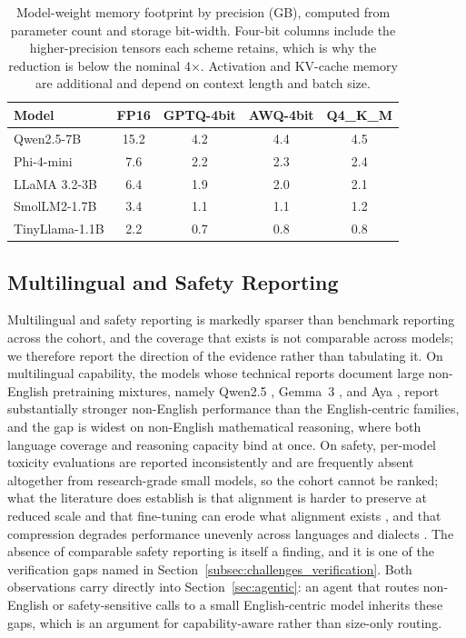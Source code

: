 \begin{table}[ht]
\centering
\caption{Model-weight memory footprint by precision (GB), computed from parameter count and storage bit-width. Four-bit columns include the higher-precision tensors each scheme retains, which is why the reduction is below the nominal 4$\times$. Activation and KV-cache memory are additional and depend on context length and batch size.}
\label{tab:memory_footprint}
\footnotesize
\begin{tabular}{lcccc}
\toprule
\textbf{Model} & \textbf{FP16} & \textbf{GPTQ-4bit} & \textbf{AWQ-4bit} & \textbf{Q4\_K\_M} \\
\midrule
Qwen2.5-7B & 15.2 & 4.2 & 4.4 & 4.5 \\
Phi-4-mini & 7.6 & 2.2 & 2.3 & 2.4 \\
LLaMA 3.2-3B & 6.4 & 1.9 & 2.0 & 2.1 \\
SmolLM2-1.7B & 3.4 & 1.1 & 1.1 & 1.2 \\
TinyLlama-1.1B & 2.2 & 0.7 & 0.8 & 0.8 \\
\bottomrule
\end{tabular}
\end{table}

\subsection{Multilingual and Safety Reporting}
\label{subsec:reported_safety}

Multilingual and safety reporting is markedly sparser than benchmark reporting
across the cohort, and the coverage that exists is not comparable across models;
we therefore report the direction of the evidence rather than tabulating it.
On multilingual capability, the models whose technical reports document
large non-English pretraining mixtures, namely Qwen2.5 \citep{qwen2024qwen25}, Gemma~3
\citep{team2025gemma3}, and Aya \citep{ustun2024aya}, report substantially
stronger non-English performance than the English-centric families, and the gap
is widest on non-English mathematical reasoning, where both language coverage and
reasoning capacity bind at once. On safety, per-model toxicity evaluations are
reported inconsistently and are frequently absent altogether from research-grade
small models, so the cohort cannot be ranked; what the literature does establish
is that alignment is harder to preserve at reduced scale and that fine-tuning can
erode what alignment exists \citep{qi2023finetuning}, and that compression
degrades performance unevenly across languages and dialects
\citep{blodgett2020language,kurz2025pruning_vs_quant}. The absence of
comparable safety reporting is itself a finding, and it is one of the
verification gaps named in Section~\ref{subsec:challenges_verification}.
Both observations carry directly into
Section~\ref{sec:agentic}: an agent that routes non-English or safety-sensitive
calls to a small English-centric model inherits these gaps, which is an argument
for capability-aware rather than size-only routing.
